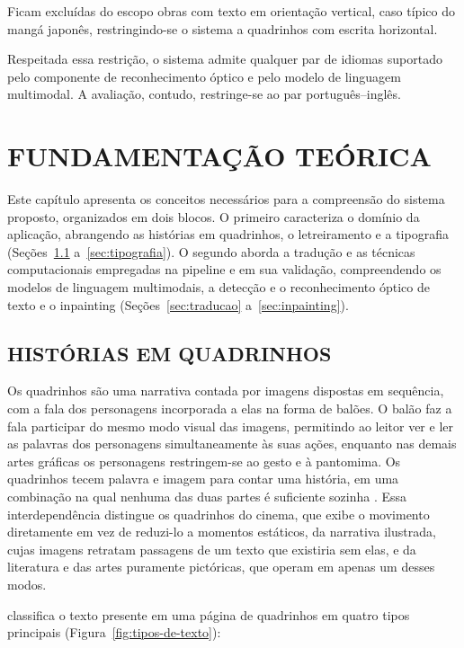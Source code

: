 \documentclass[
    12pt,
    openright,
    oneside,
    a4paper,
    chapter=TITLE,
    section=TITLE,
    english,
    brazilian,
    brazil
]{abntex2}
\begin{document}
Ficam excluídas do escopo obras com texto em orientação vertical, caso típico do mangá japonês, restringindo-se o sistema a quadrinhos com escrita horizontal.

Respeitada essa restrição, o sistema admite qualquer par de idiomas suportado pelo componente de reconhecimento óptico e pelo modelo de linguagem multimodal. A avaliação, contudo, restringe-se ao par português--inglês.

\chapter{FUNDAMENTAÇÃO TEÓRICA}

Este capítulo apresenta os conceitos necessários para a compreensão do sistema proposto, organizados em dois blocos. O primeiro caracteriza o domínio da aplicação, abrangendo as histórias em quadrinhos, o letreiramento e a tipografia (Seções~\ref{sec:quadrinhos} a~\ref{sec:tipografia}). O segundo aborda a tradução e as técnicas computacionais empregadas na pipeline e em sua validação, compreendendo os modelos de linguagem multimodais, a detecção e o reconhecimento óptico de texto e o inpainting (Seções~\ref{sec:traducao} a~\ref{sec:inpainting}).

\section{HISTÓRIAS EM QUADRINHOS}
\label{sec:quadrinhos}

Os quadrinhos são uma narrativa contada por imagens dispostas em sequência, com a fala dos personagens incorporada a elas na forma de balões. O balão faz a fala participar do mesmo modo visual das imagens, permitindo ao leitor ver e ler as palavras dos personagens simultaneamente às suas ações, enquanto nas demais artes gráficas os personagens restringem-se ao gesto e à pantomima. Os quadrinhos tecem palavra e imagem para contar uma história, em uma combinação na qual nenhuma das duas partes é suficiente sozinha \cite{harvey1994art}. Essa interdependência distingue os quadrinhos do cinema, que exibe o movimento diretamente em vez de reduzi-lo a momentos estáticos, da narrativa ilustrada, cujas imagens retratam passagens de um texto que existiria sem elas, e da literatura e das artes puramente pictóricas, que operam em apenas um desses modos.

 classifica o texto presente em uma página de quadrinhos em quatro tipos principais (Figura~\ref{fig:tipos-de-texto}):
\end{document}
